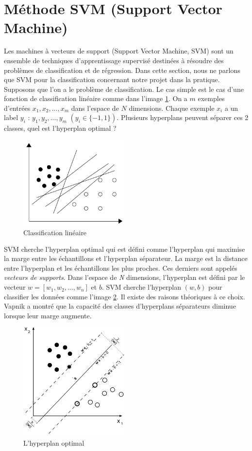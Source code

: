 \section{Méthode SVM (Support Vector Machine)}
Les machines à vecteurs de support (Support Vector Machine, SVM) sont un ensemble de techniques d'apprentissage supervisé destinées à résoudre des problèmes de classification et de régression. Dans cette section, nous ne parlons que SVM pour la classification concernant notre projet dans la pratique.\\

Supposons que l'on a le problème de classification. Le cas simple est le cas d'une fonction de classification linéaire comme dans l'image \ref{slines}. On a $m$ exemples d'entrées $x_1, x_2, ..., x_m$ dans l'espace de $N$ dimensions. Chaque exemple $x_i$ a un label $y_i$ : $y_1, y_2, ..., y_m$ $(y_i \in \{-1,1\})$. Plusieurs hyperplans peuvent séparer ces 2 classes, quel est l'hyperplan optimal ?

\begin{figure}[ht!]
\centering
\includegraphics[width=55mm]{images/separating_lines}
\caption{Classification linéaire}
\label{slines}
\end{figure}

SVM cherche l'hyperplan optimal qui est défini comme l'hyperplan qui maximise la marge entre les échantillons et l'hyperplan séparateur. La marge est la distance entre l'hyperplan et les échantillons les plus proches. Ces derniers sont appelés \textit{vecteurs de supports}. Dans l'espace de \textit{N} dimensions, l'hyperplan est défini par le vecteur $w=[w_1,w_2,...,w_n]$ et $b$. SVM cherche l'hyperplan $(w, b)$ pour classifier les données comme l'image \ref{max_margin}. Il existe des raisons théoriques à ce choix. Vapnik a montré que la capacité des classes d'hyperplans séparateurs diminue lorsque leur marge augmente\cite{vv82}.

\begin{figure}[H]
\centering
\includegraphics[width=55mm]{images/margin}
\caption{L'hyperplan optimal}
\label{max_margin}
\end{figure}

